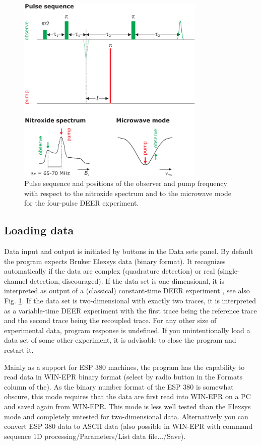 \documentclass{article}
\begin{document}
\begin{figure}[ht]
 	\begin{center}
  \includegraphics[width=0.8\textwidth]{fig2.pdf}
	\end{center}
	\caption{Pulse sequence and positions of the observer and pump frequency with
respect to the nitroxide spectrum and to the microwave mode for the four-pulse
DEER experiment.}
	\label{fig:manfig2}
\end{figure}

\subsection{Loading data}
Data input and output is initiated by buttons in the {\ttfamily Data sets} panel. By default the program expects Bruker Elexsys data (binary format). It recognizes
automatically if the data are complex (quadrature detection) or real
(single-channel detection, discouraged). If the data set is one-dimensional, it
is interpreted as output of a (classical) constant-time DEER experiment \cite{pannier2000}, see also Fig. \ref{fig:manfig2}.
If the data set is two-dimensional with exactly two traces, it is interpreted as
a variable-time DEER experiment \cite{jeschke2004b} with the first trace being the reference
trace and the second trace being the recoupled trace. For any other size of
experimental data, program response is undefined. If you unintentionally load
a data set of some other experiment, it is advisable to close the program and
restart it.

Mainly as a support for ESP 380 machines, the program has the capability
to read data in WIN-EPR binary format (select by radio button in the {\ttfamily Formats}
column of the). As the binary number format of the ESP 380 is somewhat obscure,
this mode requires that the data are first read into WIN-EPR on a PC and
saved again from WIN-EPR. This mode is less well tested than the Elexsys
mode and completely untested for two-dimensional data. Alternatively you can
convert ESP 380 data to ASCII data (also possible in WIN-EPR with command
sequence {\ttfamily 1D processing/Parameters/List data file.../Save}).
\end{document}
